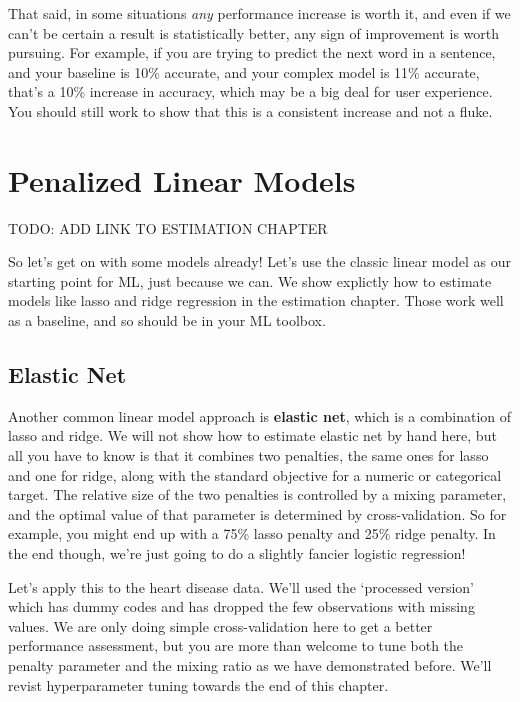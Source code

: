 \documentclass[
  letterpaper,
]{krantz}
\begin{document}
That said, in some situations \emph{any} performance increase is worth
it, and even if we can't be certain a result is statistically better,
any sign of improvement is worth pursuing. For example, if you are
trying to predict the next word in a sentence, and your baseline is 10\%
accurate, and your complex model is 11\% accurate, that's a 10\%
increase in accuracy, which may be a big deal for user experience. You
should still work to show that this is a consistent increase and not a
fluke.

\section{Penalized Linear Models}\label{penalized-linear-models}

TODO: ADD LINK TO ESTIMATION CHAPTER

So let's get on with some models already! Let's use the classic linear
model as our starting point for ML, just because we can. We show
explictly how to estimate models like lasso and ridge regression in the
estimation chapter. Those work well as a baseline, and so should be in
your ML toolbox.

\subsection{Elastic Net}\label{elastic-net}

Another common linear model approach is \textbf{elastic net}, which is a
combination of lasso and ridge. We will not show how to estimate elastic
net by hand here, but all you have to know is that it combines two
penalties, the same ones for lasso and one for ridge, along with the
standard objective for a numeric or categorical target. The relative
size of the two penalties is controlled by a mixing parameter, and the
optimal value of that parameter is determined by cross-validation. So
for example, you might end up with a 75\% lasso penalty and 25\% ridge
penalty. In the end though, we're just going to do a slightly fancier
logistic regression!

Let's apply this to the heart disease data. We'll used the `processed
version' which has dummy codes and has dropped the few observations with
missing values. We are only doing simple cross-validation here to get a
better performance assessment, but you are more than welcome to tune
both the penalty parameter and the mixing ratio as we have demonstrated
before. We'll revist hyperparameter tuning towards the end of this
chapter.
\end{document}
